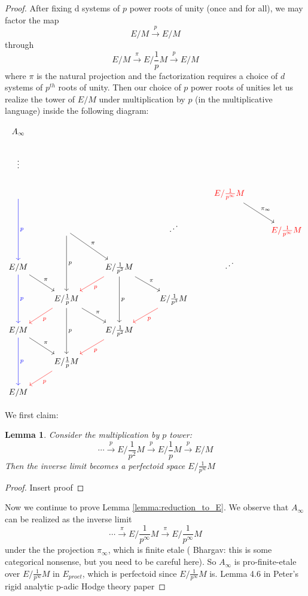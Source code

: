 \documentclass[11pt,oneside]{amsart}
\theoremstyle{theorem}
\newtheorem{lemma}[theorem]{Lemma}
\theoremstyle{definition}
\theoremstyle{remark}
\begin{document}
\begin{proof} 



After fixing d systems of $p$ power roots of unity (once and for all), we may factor the map 
$$E/M \xrightarrow{ p} E/M$$ through 
$$E/M \xrightarrow{\pi} E/\frac{1}{p} M \xrightarrow{ p} E/M $$ where $\pi $ is the natural projection and the factorization requires a choice of $d$ systems of $p^{th}$ roots of unity. Then our choice of $p$ power roots of unities let us realize the tower of $E/M$ under multiplication by $p$ (in the multiplicative language) inside the following diagram: 



\[
\begin{tikzcd}
A_\infty  \\
\vdots \\ 
 \arrow[blue]{dd}{p} & & & & {\color{red} E/\frac{1}{p^\infty} M }  \arrow{rd}{\pi_\infty}  \\
\empty & \empty  \arrow{dd}{p} \arrow{rd}{\pi} & & \reflectbox{$\ddots$}  & &  
{\color{red} E/\frac{1}{p^\infty} M }  \\
E/M  \arrow{rd}{\pi}  \arrow[blue]{dd}{p}    & &              E/\frac{1}{p^2}M   \arrow{rd}{\pi} \arrow{dd}{p}  \arrow[red]{ld}{p}  & & \reflectbox{$\ddots$} \\
 &       E/\frac{1}{p}M   \arrow{dd}{p}    \arrow{rd}{\pi}      \arrow[red]{ld}{p}         &&         E/\frac{1}{p^3}M   \arrow[red]{ld}{p}  \\
E/M  \arrow[blue]{dd}{p}   \arrow{rd}{\pi}          &&              E/\frac{1}{p^2}M   \arrow[red]{ld}{p} \\
   &     E/\frac{1}{p}M       \arrow[red]{ld}{p}   && \\
E/M
\end{tikzcd}
\]



We first claim: 
\begin{lemma}
Consider the multiplication by $p$ tower: 
$$ \cdots \xrightarrow{p}  E/\frac{1}{p^2} M  \xrightarrow{p}    E/\frac{1}{p} M  \xrightarrow{p}   E/M $$
Then the inverse limit becomes a perfectoid space $E/\frac{1}{p^\infty} M$
\end{lemma}

\begin{proof} 
{\color{red} Insert proof}
\end{proof} 


Now we continue to prove Lemma \ref{lemma:reduction_to_E}. We observe that $A_\infty$ can be realized as the inverse limit 
$$\cdots \xrightarrow{\pi} E/\frac{1}{p^\infty} M  \xrightarrow{\pi} E/\frac{1}{p^\infty} M$$ under the the projection $\pi_\infty$, which is finite etale ({\color{blue} Bhargav: this is some categorical nonsense, but you need to be careful here}). So $A_\infty$ is pro-finite-etale over $E/\frac{1}{p^\infty} M$ in $E_{proet}$, which is perfectoid since  $E/\frac{1}{p^\infty} M$  is.  {\color{red}  Lemma 4.6 in Peter's rigid analytic p-adic Hodge theory paper} 

\end{proof} 
\end{document}
